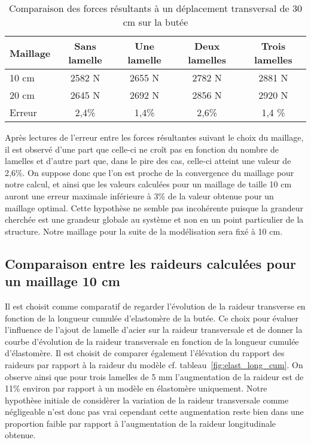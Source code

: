 ﻿\documentclass{article}
\begin{document}
\begin{table}[h]
\centering
\begin{tabular}{|l|c|c|c|c|}
\hline
Maillage & Sans lamelle & Une lamelle & Deux lamelles & Trois lamelles \\ \hline
10 cm & 2582 N & 2655 N & 2782 N & 2881 N \\ \hline
20 cm & 2645 N & 2692 N & 2856 N & 2920 N \\ \hline
Erreur & 2,4\% & 1,4\% & 2,6\% & 1,4 \% \\ \hline
\end{tabular}
\caption{Comparaison des forces résultants à un déplacement transversal de 30 cm sur la butée}
\label{tab:comp_mesh_transverse}
\end{table}


Après lectures de l'erreur entre les forces résultantes suivant le choix du maillage, il est observé d'une part que celle-ci ne croît pas en fonction du nombre de lamelles et d'autre part que, dans le pire des cas, celle-ci atteint une valeur de 2,6\%. On suppose donc que l'on est proche de la convergence du maillage pour notre calcul, et ainsi que les valeurs calculées pour un maillage de taille 10 cm auront une erreur maximale inférieure à 3\% de la valeur obtenue pour un maillage optimal. Cette hypothèse ne semble pas incohérente puisque la grandeur cherchée est une grandeur globale au système et non en un point particulier de la structure.  Notre maillage pour la suite de la modélisation sera fixé à 10 cm.

\subsection{Comparaison entre les raideurs calculées pour un maillage 10 cm}
Il est choisit comme comparatif de regarder l'évolution de la raideur transverse en fonction de la longueur cumulée d'elastomère de la butée. Ce choix pour évaluer l'influence de l'ajout de lamelle d'acier sur la raideur transversale et de donner la courbe d'évolution de la raideur transversale en fonction de la longueur cumulée d'élastomère. Il est choisit de comparer également l'élévation du rapport des raideurs par rapport à la raideur du modèle cf. tableau~\ref{fig:elast_long_cum}.
On observe ainsi que pour trois lamelles de 5 mm l'augmentation de la raideur est de 11\% environ par rapport à un modèle en élastomère uniquement. Notre hypothèse initiale de considèrer la variation de la raideur transversale comme négligeable n'est donc pas vrai cependant cette augmentation reste bien dans une proportion faible par rapport à l'augmentation de la raideur longitudinale obtenue.
\end{document}
